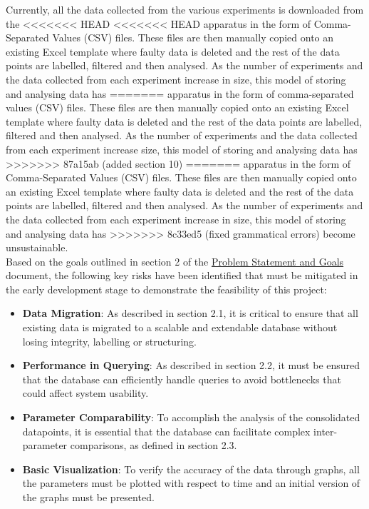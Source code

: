 \documentclass{article}
\begin{document}
Currently, all the data collected from the various experiments is downloaded from the 
<<<<<<< HEAD
<<<<<<< HEAD
apparatus in the form of Comma-Separated Values (CSV) files. These files are then manually
copied onto an existing Excel template where faulty data is deleted and the rest of the data points
are labelled, filtered and then analysed. As the number of experiments and the data collected
from each experiment increase in size, this model of storing and analysing data has
=======
apparatus in the form of comma-separated values (CSV) files. These files are then manually
copied onto an existing Excel template where faulty data is deleted and the rest of the data points
are labelled, filtered and then analysed. As the number of experiments and the data collected
from each experiment increase size, this model of storing and analysing data has
>>>>>>> 87a15ab (added section 10)
=======
apparatus in the form of Comma-Separated Values (CSV) files. These files are then manually
copied onto an existing Excel template where faulty data is deleted and the rest of the data points
are labelled, filtered and then analysed. As the number of experiments and the data collected
from each experiment increase in size, this model of storing and analysing data has
>>>>>>> 8c33ed5 (fixed grammatical errors)
become unsustainable.\\
\newline
\noindent Based on the goals outlined in section 2 of the \href{https://github.com/SumanyaG/Alkalytics/blob/6efc4b2a5f37f2309be86f1e1bfc49c1ddfd097d/docs/ProblemStatementAndGoals/ProblemStatement.pdf}{Problem Statement and Goals} document,
the following key risks have been identified that must be mitigated in the early development
stage to demonstrate the feasibility of this project:
\begin{itemize}
<<<<<<< HEAD
<<<<<<< HEAD
  \item \textbf{Data Migration}: As described in section 2.1, it is critical to ensure that all existing 
  data is migrated to a scalable and extendable database without losing integrity, labelling or structuring.
  \item \textbf{Performance in Querying}: As described in section 2.2, it must be ensured that the database can 
  efficiently handle queries to avoid bottlenecks that could affect system usability.
  \item \textbf{Parameter Comparability}: To accomplish the analysis of the consolidated datapoints, it is essential
  that the database can facilitate complex inter-parameter comparisons, as defined in section 2.3.
  \item \textbf{Basic Visualization}: To verify the accuracy of the data through graphs, all the parameters must 
  be plotted with respect to time and an initial version of the graphs must be presented.
\end{itemize}
\end{document}
